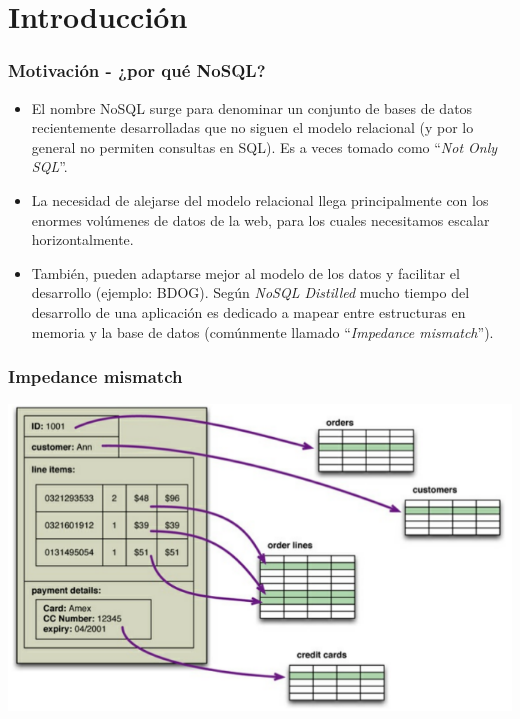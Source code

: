 \section{Introducción}

\begin{frame}
\frametitle{Motivación - ¿por qué NoSQL?}
\begin{itemize}

\item	El nombre NoSQL surge para denominar un conjunto de bases
	de datos recientemente desarrolladas que no siguen el modelo
	relacional (y por lo general no permiten consultas en SQL).
	Es a veces tomado como ``\textit{Not Only SQL}''.
	\pause

\item	La necesidad de alejarse del modelo relacional llega
	principalmente con los enormes volúmenes de datos de la web,
	para los cuales necesitamos escalar horizontalmente.
	\pause

\item	También, pueden adaptarse mejor al modelo de los datos y facilitar
	el desarrollo (ejemplo: BDOG). Según \textit{NoSQL Distilled} mucho
	tiempo del desarrollo de una aplicación es dedicado a mapear entre
	estructuras en memoria y la base de datos (comúnmente llamado
	``\textit{Impedance mismatch}'').
\end{itemize}
\end{frame}

\begin{frame}
\frametitle{Impedance mismatch}
\includegraphics[width=\linewidth,height=\textheight,keepaspectratio]{impedance}
\end{frame}

